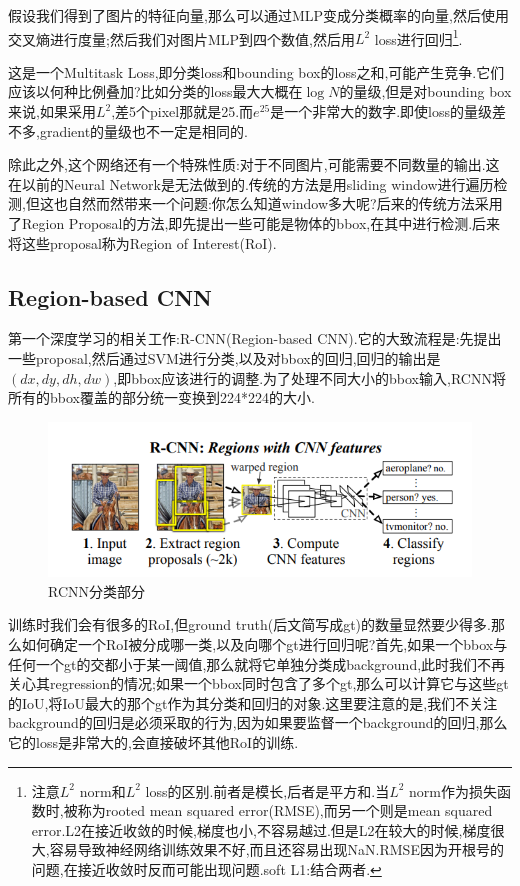 	假设我们得到了图片的特征向量,那么可以通过MLP变成分类概率的向量,然后使用交叉熵进行度量;然后我们对图片MLP到四个数值,然后用$L^2$ loss进行回归\footnote{注意$L^2$ norm和$L^2$ loss的区别.前者是模长,后者是平方和.当$L^2$ norm作为损失函数时,被称为rooted mean squared error(RMSE),而另一个则是mean squared error.L2在接近收敛的时候,梯度也小,不容易越过.但是L2在较大的时候,梯度很大,容易导致神经网络训练效果不好,而且还容易出现NaN.RMSE因为开根号的问题,在接近收敛时反而可能出现问题.soft L1:结合两者.}.
	
	这是一个Multitask Loss,即分类loss和bounding box的loss之和,可能产生竞争.它们应该以何种比例叠加?比如分类的loss最大大概在$\log N$的量级,但是对bounding box来说,如果采用$L^2$,差5个pixel那就是25.而$e^{25}$是一个非常大的数字.即使loss的量级差不多,gradient的量级也不一定是相同的.
	
	除此之外,这个网络还有一个特殊性质:对于不同图片,可能需要不同数量的输出.这在以前的Neural Network是无法做到的.传统的方法是用sliding window进行遍历检测,但这也自然而然带来一个问题:你怎么知道window多大呢?后来的传统方法采用了Region Proposal的方法,即先提出一些可能是物体的bbox,在其中进行检测.后来将这些proposal称为Region of Interest(RoI).
	\subsection{Region-based CNN}
	
	第一个深度学习的相关工作\cite{RCNN}:R-CNN(Region-based CNN).它的大致流程是:先提出一些proposal,然后通过SVM进行分类,以及对bbox的回归,回归的输出是$(dx, dy, dh, dw)$,即bbox应该进行的调整.为了处理不同大小的bbox输入,RCNN将所有的bbox覆盖的部分统一变换到224*224的大小.
	
	\begin{figure}[htbp]
		\centering
		\includegraphics[scale=0.7]{figures/RCNN_classification.png}
		\caption{RCNN分类部分}
	\end{figure}
	
	训练时我们会有很多的RoI,但ground truth(后文简写成gt)的数量显然要少得多.那么如何确定一个RoI被分成哪一类,以及向哪个gt进行回归呢?首先,如果一个bbox与任何一个gt的交都小于某一阈值,那么就将它单独分类成background,此时我们不再关心其regression的情况;如果一个bbox同时包含了多个gt,那么可以计算它与这些gt的IoU,将IoU最大的那个gt作为其分类和回归的对象.这里要注意的是,我们不关注background的回归是必须采取的行为,因为如果要监督一个background的回归,那么它的loss是非常大的,会直接破坏其他RoI的训练.
	
